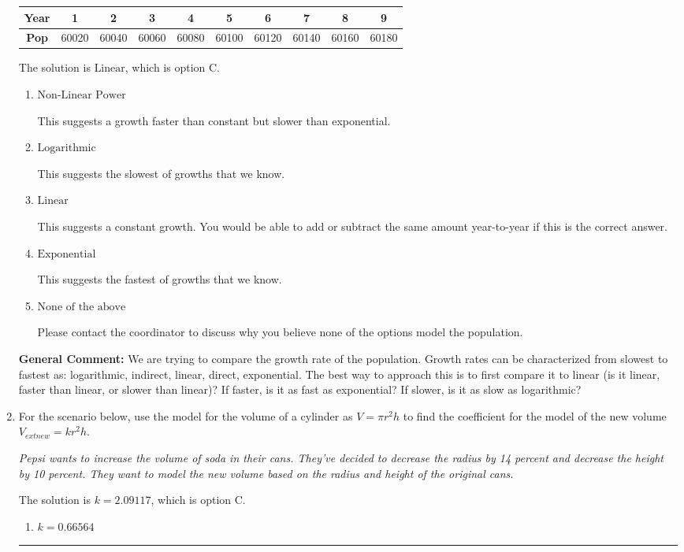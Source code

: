 \documentclass{extbook}[14pt]
\newcommand{\litem}[1]{\item #1

\rule{\textwidth}{0.4pt}}
\begin{document}
\begin{enumerate}
{\begin{tabular}{c|c|c|c|c|c|c|c|c|c}
\textbf{Year} &1 &2 &3 &4 &5 &6 &7 &8 &9\tabularnewline \hline
\textbf{Pop} &60020 &60040 &60060 &60080 &60100 &60120 &60140 &60160 &60180\end{tabular}The solution is \( \text{Linear} \), which is option C.\begin{enumerate}[label=\Alph*.]
\item \( \text{Non-Linear Power} \)

This suggests a growth faster than constant but slower than exponential.
\item \( \text{Logarithmic} \)

This suggests the slowest of growths that we know.
\item \( \text{Linear} \)

This suggests a constant growth. You would be able to add or subtract the same amount year-to-year if this is the correct answer.
\item \( \text{Exponential} \)

This suggests the fastest of growths that we know.
\item \( \text{None of the above} \)

Please contact the coordinator to discuss why you believe none of the options model the population.
\end{enumerate}

\textbf{General Comment:} We are trying to compare the growth rate of the population. Growth rates can be characterized from slowest to fastest as: logarithmic, indirect, linear, direct, exponential. The best way to approach this is to first compare it to linear (is it linear, faster than linear, or slower than linear)? If faster, is it as fast as exponential? If slower, is it as slow as logarithmic?
}
\litem{
For the scenario below, use the model for the volume of a cylinder as $V = \pi r^2 h$ to find the coefficient for the model of the new volume $V_{	ext{new}} = k r^2 h$.

\begin{center}
    \textit{ Pepsi wants to increase the volume of soda in their cans. They've decided to decrease the radius by 14 percent and decrease the height by 10 percent. They want to model the new volume based on the radius and height of the original cans. }
\end{center}
The solution is \( k = 2.09117 \), which is option C.\begin{enumerate}[label=\Alph*.]
\item \( k = 0.66564 \)


\end{enumerate}}
\end{enumerate}
\end{document}
